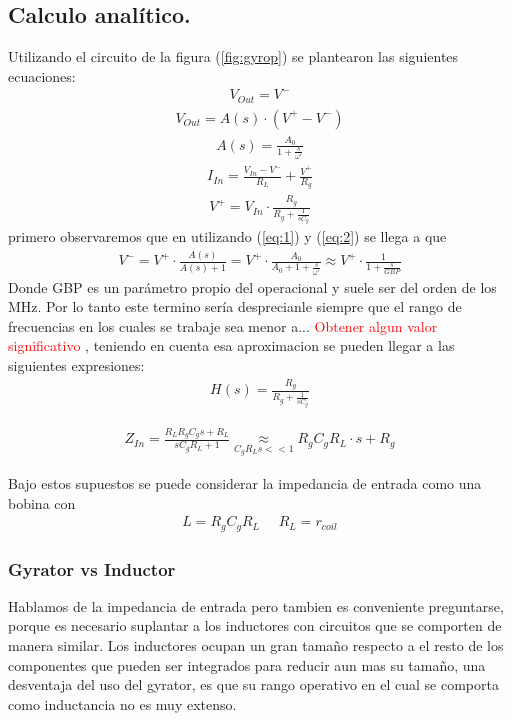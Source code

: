 \documentclass[a4paper]{article}
\begin{document}
\subsection{Calculo analítico.}
Utilizando el circuito de la figura (\ref{fig:gyrop}) se plantearon las siguientes ecuaciones:
\begin{align}   V_{Out} = V^- \label{eq:1}\end{align}
\begin{align} V_{Out} = A(s) \cdot (V^+-V^-)\label{eq:2}\end{align}
\begin{align} A(s)= \frac{A_0}{1+\frac{s}{\omega'}}\end{align}
\begin{align} I_{In}=\frac{V_{In}-V^-}{R_L}+\frac{V^+}{R_g}\end{align}
\begin{align} V^+=V_{In}\cdot \frac{R_g}{R_g+\frac{1}{sC_g}} \end{align}
primero observaremos que en utilizando (\ref{eq:1}) y (\ref{eq:2}) se llega a que 
\begin{align}V^- =V^+ \cdot \frac{A(s)}{A(s)+1} = V^+ \cdot \frac{A_0}{A_0+1+\frac{s}{\omega'}} \approx V^+ \cdot \frac{1}{1+\frac{s}{GBP}} \label{eq:desp}   \end{align}
Donde GBP es un parámetro propio del operacional y suele ser del orden de los MHz. Por lo tanto este termino sería desprecianle siempre que el rango de frecuencias en los cuales se trabaje sea menor a... \center \textcolor{red}{Obtener algun valor significativo}
, teniendo en cuenta esa aproximacion se pueden llegar a las siguientes expresiones:
\begin{align}H(s)= \frac{R_g}{R_g+\frac{1}{sC_g}} \end{align}


\begin{align}Z_{In}=\frac{R_LR_gC_gs+R_L}{sC_gR_L+1}\underset{C_gR_Ls << 1}{\approx}R_gC_gR_L \cdot s + R_g \end{align}

Bajo estos supuestos se puede considerar la impedancia de entrada como una bobina con 
\begin{align}  L=R_gC_gR_L  \ \ \ \ \ \  R_L=r_{coil} \label{eq:basicL1}\end{align}
\flushleft
\subsubsection{Gyrator vs Inductor}
Hablamos de la impedancia de entrada pero tambien es conveniente preguntarse, porque es necesario suplantar a los inductores con circuitos que se comporten de manera similar.
Los inductores ocupan un gran tamaño respecto a el resto de los componentes que pueden ser integrados para reducir aun mas su tamaño, una desventaja del uso del gyrator, es que su rango operativo en el cual se comporta como inductancia no es muy extenso.
\end{document}
